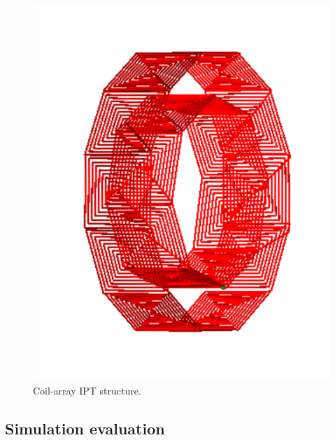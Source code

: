 \begin{figure}[htbp]
    \centering
    \includegraphics[width=0.5\linewidth]{images/4_coil_array_system.png}
    \caption{Coil-array IPT structure.}
\end{figure}


\subsection{Simulation evaluation}


